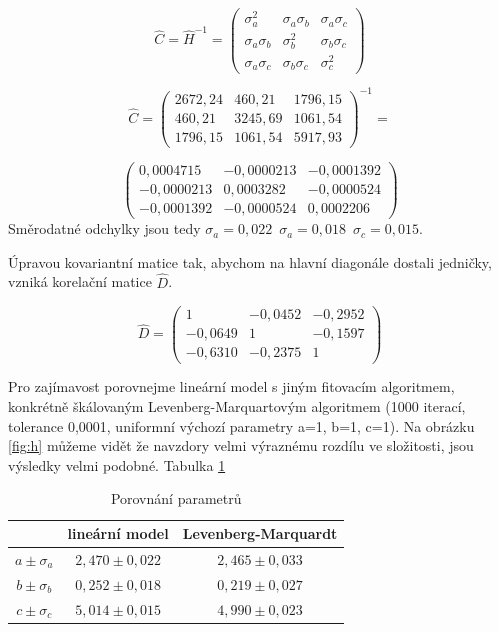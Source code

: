 \documentclass[12pt]{article}
\begin{document}
$$
\hat{C} = \hat{H}^{-1} = \left(\begin{array}{ccc}
\sigma_a^2 & \sigma_a\sigma_b & \sigma_a\sigma_c \\
\sigma_a\sigma_b & \sigma_b^2 & \sigma_b\sigma_c \\
\sigma_a\sigma_c & \sigma_b\sigma_c & \sigma_c^2 \end{array}\right)
$$

$$\hat{C}=
\left(\begin{array}{ccc}
2672,24 & 460,21 & 1796,15\\
460,21 & 3245,69 & 1061,54\\
1796,15 & 1061,54 & 5917,93
\end{array}\right)^{-1} = $$


$$\left(\begin{array}{ccc}
 0,0004715 & -0,0000213 & -0,0001392\\
-0,0000213 & 0,0003282 & -0,0000524\\
-0,0001392 & -0,0000524 & 0,0002206\end{array}\right)$$
Směrodatné odchylky jsou tedy $\sigma_a = 0,022\,\,\, \sigma_a = 0,018\,\,\,\sigma_c = 0,015$.

Úpravou kovariantní matice tak, abychom na hlavní diagonále dostali jedničky, vzniká korelační matice $\hat{D}$.

$$\hat{D} = \left(\begin{array}{ccc}
 1 & -0,0452 & -0,2952\\
-0,0649 & 1 & -0,1597\\
-0,6310 & -0,2375 & 1\end{array}\right)$$





Pro zajímavost porovnejme lineární model s jiným fitovacím algoritmem, konkrétně škálovaným Levenberg-Marquartovým algoritmem (1000 iterací, tolerance 0,0001, uniformní výchozí parametry a=1, b=1, c=1). Na obrázku \ref{fig:h} můžeme vidět že navzdory velmi výraznému rozdílu ve složitosti, jsou výsledky velmi podobné. Tabulka \ref{ref:tab}

\begin{table}[h!]
 \centering
 \begin{tabular}{|c|c|c|}
  \hline
  {\bf } & {\bf lineární model} & {\bf Levenberg-Marquardt} \\
   \hline \hline
	$a \pm \sigma_a $ & $2,470 \pm 0,022$ & $2,465 \pm 0,033$ \\
	$b \pm \sigma_b $ & $0,252 \pm 0,018$ & $0,219 \pm 0,027$ \\
	$c \pm \sigma_c $ & $5,014 \pm 0,015$ & $4,990 \pm 0,023$ \\
	\hline
  \end{tabular}
  \caption{Porovnání parametrů}
  \label{ref:tab}
\end{table}
\end{document}
